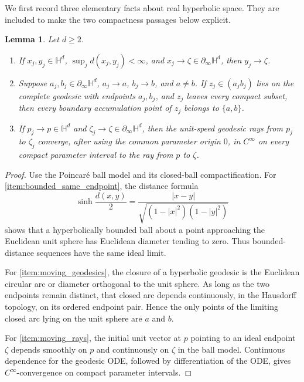 \documentclass[11pt]{amsart}
\theoremstyle{plain}
\newtheorem{lemma}[theorem]{Lemma}
\theoremstyle{plain}
\theoremstyle{plain}
\numberwithin{equation}{section}
\begin{document}
We first record three elementary facts about real hyperbolic space.  They
are included to make the two compactness passages below explicit.

\begin{lemma}\label{lem:visual_facts}
Let \(d\geq2\).
\begin{enumerate}[label=\textup{(\alph*)},leftmargin=3em]
\item\label{item:bounded_same_endpoint}
If \(x_j,y_j\in\mathbb H^d\),
\(\sup_jd(x_j,y_j)<\infty\), and
\(x_j\to\zeta\in\partial_\infty\mathbb H^d\), then
\(y_j\to\zeta\).

\item\label{item:moving_geodesics}
Suppose \(a_j,b_j\in\partial_\infty\mathbb H^d\),
\(a_j\to a\), \(b_j\to b\), and \(a\neq b\).  If
\(z_j\in(a_jb_j)\) lies on the complete geodesic with endpoints
\(a_j,b_j\), and \(z_j\) leaves every compact subset, then every boundary
accumulation point of \(z_j\) belongs to \(\{a,b\}\).

\item\label{item:moving_rays}
If \(p_j\to p\in\mathbb H^d\) and
\(\zeta_j\to\zeta\in\partial_\infty\mathbb H^d\), then the unit-speed
geodesic rays from \(p_j\) to \(\zeta_j\) converge, after using the common
parameter origin \(0\), in \(C^\infty\) on every compact parameter
interval to the ray from \(p\) to \(\zeta\).
\end{enumerate}
\end{lemma}

\begin{proof}
Use the Poincar\'e ball model and its closed-ball compactification.  For
\ref{item:bounded_same_endpoint}, the distance formula
\[
\sinh\frac{d(x,y)}2
=
\frac{|x-y|}{\sqrt{(1-|x|^2)(1-|y|^2)}}
\]
shows that a hyperbolically bounded ball about a point approaching the
Euclidean unit sphere has Euclidean diameter tending to zero.  Thus
bounded-distance sequences have the same ideal limit.

For \ref{item:moving_geodesics}, the closure of a hyperbolic geodesic is
the Euclidean circular arc or diameter orthogonal to the unit sphere.  As
long as the two endpoints remain distinct, that closed arc depends
continuously, in the Hausdorff topology, on its ordered endpoint pair.  Hence
the only points of the limiting closed arc lying on the unit sphere are
\(a\) and \(b\).

For \ref{item:moving_rays}, the initial unit vector at \(p\) pointing to
an ideal endpoint \(\zeta\) depends smoothly on \(p\) and continuously on
\(\zeta\) in the ball model.  Continuous dependence for the geodesic ODE,
followed by differentiation of the ODE, gives \(C^\infty\)-convergence on
compact parameter intervals.
\end{proof}
\end{document}
